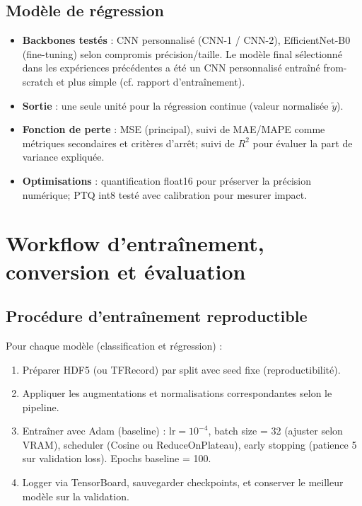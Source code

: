 \subsection{Modèle de régression}

\begin{itemize}
    \item \textbf{Backbones testés} : CNN personnalisé (CNN-1 / CNN-2), EfficientNet-B0 (fine-tuning) selon compromis précision/taille. Le modèle final sélectionné dans les expériences précédentes a été un CNN personnalisé entraîné from-scratch et plus simple (cf. rapport d'entraînement).
    \item \textbf{Sortie} : une seule unité pour la régression continue (valeur normalisée $\tilde{y}$).
    \item \textbf{Fonction de perte} : MSE (principal), suivi de MAE/MAPE comme métriques secondaires et critères d'arrêt; suivi de \(R^2\) pour évaluer la part de variance expliquée.
    \item \textbf{Optimisations} : quantification float16 pour préserver la précision numérique; PTQ int8 testé avec calibration pour mesurer impact.
\end{itemize}

\section{Workflow d'entraînement, conversion et évaluation}

\subsection{Procédure d'entraînement reproductible}

Pour chaque modèle (classification et régression) :
\begin{enumerate}
    \item Préparer HDF5 (ou TFRecord) par split avec seed fixe (reproductibilité).
    \item Appliquer les augmentations et normalisations correspondantes selon le pipeline.
    \item Entraîner avec Adam (baseline) : $\mathrm{lr}=10^{-4}$, batch size = 32 (ajuster selon VRAM), scheduler (Cosine ou ReduceOnPlateau), early stopping (patience 5 sur validation loss). Epochs baseline = 100.
    \item Logger via TensorBoard, sauvegarder checkpoints, et conserver le meilleur modèle sur la validation.
\end{enumerate}

